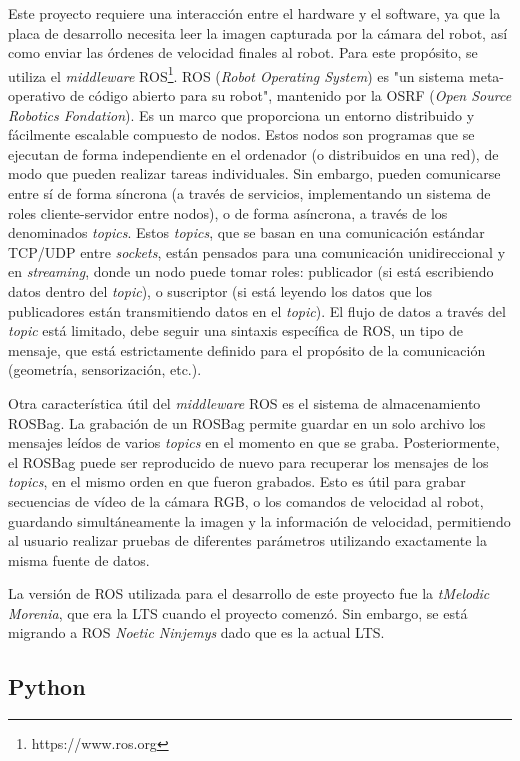 Este proyecto requiere una interacción entre el hardware y el software, ya que la placa de desarrollo necesita leer la imagen capturada por la cámara del robot, así como enviar las órdenes de velocidad finales al robot. Para este propósito, se utiliza el \textit{middleware} ROS\footnote{https://www.ros.org}. ROS (\textit{Robot Operating System}) es "un sistema meta-operativo de código abierto para su robot", mantenido por la OSRF (\textit{Open Source Robotics Fondation}). Es un marco que proporciona un entorno distribuido y fácilmente escalable compuesto de nodos. Estos nodos son programas que se ejecutan de forma independiente en el ordenador (o distribuidos en una red), de modo que pueden realizar tareas individuales. Sin embargo, pueden comunicarse entre sí de forma síncrona (a través de servicios, implementando un sistema de roles cliente-servidor entre nodos), o de forma asíncrona, a través de los denominados \textit{topics}. Estos \textit{topics}, que se basan en una comunicación estándar TCP/UDP entre \textit{sockets}, están pensados para una comunicación unidireccional y en \textit{streaming}, donde un nodo puede tomar roles: publicador (si está escribiendo datos dentro del \textit{topic}), o suscriptor (si está leyendo los datos que los publicadores están transmitiendo datos en el \textit{topic}). El flujo de datos a través del \textit{topic} está limitado, debe seguir una sintaxis específica de ROS, un tipo de mensaje, que está estrictamente definido para el propósito de la comunicación (geometría, sensorización, etc.).

Otra característica útil del \textit{middleware} ROS es el sistema de almacenamiento ROSBag. La grabación de un ROSBag permite guardar en un solo archivo los mensajes leídos de varios \textit{topics} en el momento en que se graba. Posteriormente, el ROSBag puede ser reproducido de nuevo para recuperar los mensajes de los \textit{topics}, en el mismo orden en que fueron grabados. Esto es útil para grabar secuencias de vídeo de la cámara RGB, o los comandos de velocidad al robot, guardando simultáneamente la imagen y la información de velocidad, permitiendo al usuario realizar pruebas de diferentes parámetros utilizando exactamente la misma fuente de datos.

La versión de ROS utilizada para el desarrollo de este proyecto fue la \textit{tMelodic Morenia}, que era la LTS cuando el proyecto comenzó. Sin embargo, se está migrando a ROS \textit{Noetic Ninjemys} dado que es la actual LTS.

\subsection{Python}

